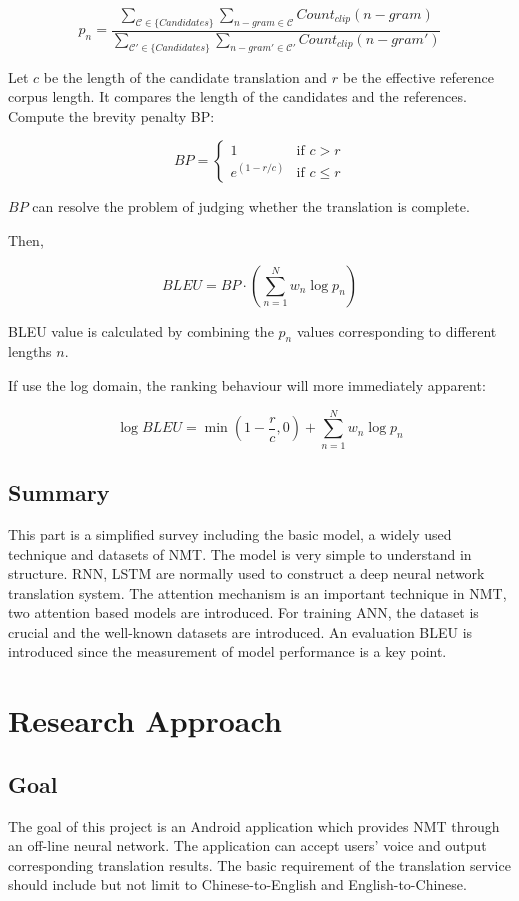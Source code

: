 \documentclass[a4paper, 12pt]{article}
\begin{document}
$$p_n = \frac{\sum_{\mathcal{C}\in\{Candidates\}}\sum_{n-gram\in \mathcal{C}}Count_{clip}(n-gram)}{\sum_{\mathcal{C'}\in\{Candidates\}}\sum_{n-gram'\in \mathcal{C'}}Count_{clip}(n-gram')}$$

Let $c$ be the length of the candidate translation and $r$ be the effective reference corpus length. It compares the length of the candidates and the references. Compute the brevity penalty BP:

\begin{equation}
BP=
\begin{cases}
1 & \text{if $c > r$}\\
e^{(1-r/c)} & \text{if $c \leq r$}
\end{cases}
\end{equation}

$BP$ can resolve the problem of judging whether the translation is complete.

Then, 

$$BLEU = BP \cdot \left(\sum_{n=1}^{N} w_n\log{p_n}\right)$$

BLEU value is calculated by combining the $p_n$ values corresponding to different lengths $n$.

If use the log domain, the ranking behaviour will more immediately apparent:

$$\log BLEU = \min{(1-\frac{r}{c}, 0)} + \sum_{n=1}^N w_n\log{p_n}$$

\subsection{Summary}
This part is a simplified survey including the basic model, a widely used technique and datasets of NMT. The model is very simple to understand in structure. RNN, LSTM are normally used to construct a deep neural network translation system. The attention mechanism is an important technique in NMT, two attention based models are introduced. For training ANN, the dataset is crucial and the well-known datasets are introduced. An evaluation BLEU is introduced since the measurement of model performance is a key point.

\section{Research Approach}


\subsection{Goal}
The goal of this project is an Android application which provides NMT through an off-line neural network. The application can accept users' voice and output corresponding translation results. The basic requirement of the translation service should include but not limit to Chinese-to-English and English-to-Chinese.
\end{document}
